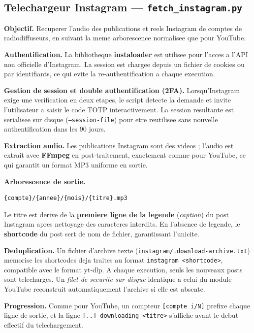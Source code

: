 \documentclass[11pt, a4paper]{article}
\begin{document}
\subsection{Telechargeur Instagram — \texttt{fetch\_instagram.py}}

\textbf{Objectif.} Recuperer l'audio des publications et reels Instagram de comptes de
radiodiffuseurs, en suivant la meme arborescence normalisee que pour YouTube.

\textbf{Authentification.} La bibliotheque \textbf{instaloader} est utilisee pour
l'acces a l'API non officielle d'Instagram. La session est chargee depuis un fichier de
cookies ou par identifiants, ce qui evite la re-authentification a chaque execution.

\textbf{Gestion de session et double authentification (2FA).}
Lorsqu'Instagram exige une verification en deux etapes, le script detecte la demande
et invite l'utilisateur a saisir le code TOTP interactivement. La session resultante est
serialisee sur disque (\texttt{--session-file}) pour etre reutilisee sans nouvelle
authentification dans les 90 jours.

\textbf{Extraction audio.} Les publications Instagram sont des videos ; l'audio est extrait
avec \textbf{FFmpeg} en post-traitement, exactement comme pour YouTube, ce qui garantit
un format MP3 uniforme en sortie.

\textbf{Arborescence de sortie.}
\begin{lstlisting}
{compte}/{annee}/{mois}/{titre}.mp3
\end{lstlisting}
Le titre est derive de la \textbf{premiere ligne de la legende} (\emph{caption}) du post
Instagram apres nettoyage des caracteres interdits. En l'absence de legende, le
\textbf{shortcode} du post sert de nom de fichier, garantissant l'unicite.

\textbf{Deduplication.} Un fichier d'archive texte (\texttt{instagram/.download-archive.txt})
memorise les shortcodes deja traites au format \texttt{instagram <shortcode>}, compatible
avec le format yt-dlp. A chaque execution, seuls les nouveaux posts sont telecharges.
Un \emph{filet de securite sur disque} identique a celui du module YouTube reconstruit
automatiquement l'archive si elle est absente.

\textbf{Progression.} Comme pour YouTube, un compteur \texttt{[compte i/N]} prefixe
chaque ligne de sortie, et la ligne \texttt{[..] downloading <titre>} s'affiche avant le
debut effectif du telechargement.
\end{document}

